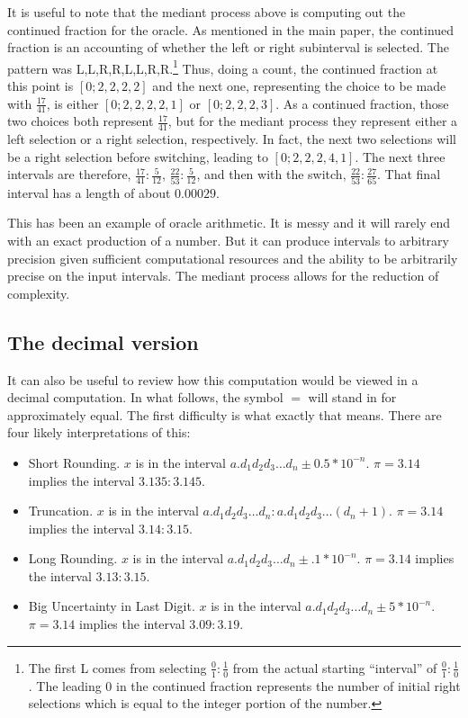 \documentclass[12pt]{article}
\theoremstyle{remark}
\begin{document}
It is useful to note that the mediant process above is computing out the continued fraction for the oracle. As mentioned in the main paper, the continued fraction is an accounting of whether the left or right subinterval is selected. The pattern was L,L,R,R,L,L,R,R.\footnote{The first L comes from selecting $\frac{0}{1}: \frac{1}{0}$ from the actual starting ``interval'' of $\frac{0}{1}: \frac{1}{0}$. The leading 0 in the continued fraction represents the number of initial right selections which is equal to the integer portion of the number.} Thus, doing a count, the continued fraction at this point is $[0;2,2,2,2]$ and the next one, representing the choice to be made with $\frac{17}{41}$, is either $[0;2,2,2,2,1]$ or $[0;2,2,2,3]$. As a continued fraction, those two choices both represent $\frac{17}{41}$, but for the mediant process they represent either a left selection or a right selection, respectively. In fact, the next two selections will be a right selection before switching, leading to $[0;2,2,2,4,1]$. The next three intervals are therefore, $\frac{17}{41}: \frac{5}{12}$, $\frac{22}{53}: \frac{5}{12}$, and then with the switch, $\frac{22}{53}: \frac{27}{65}$. That final interval has a length of about $0.00029$. 

This has been an example of oracle arithmetic. It is messy and it will rarely end with an exact production of a number. But it can produce intervals to arbitrary precision given sufficient computational resources and the ability to be arbitrarily precise on the input intervals. The mediant process allows for the reduction of complexity. 

\subsection{The decimal version}

It can also be useful to review how this computation would be viewed in a decimal computation. In what follows, the symbol $=$ will stand in for approximately equal. The first difficulty is what exactly that means. There are four likely interpretations of this:

\begin{itemize}
\item Short Rounding. $x$ is in the interval $a.d_1d_2d_3\ldots d_n \pm 0.5*10^{-n}$. $\pi = 3.14$ implies the interval $3.135:3.145$.
\item Truncation. $x$ is in the interval $a.d_1d_2d_3\ldots d_n: a.d_1d_2d_3\ldots (d_n+1)$. $\pi=3.14$ implies the interval $3.14:3.15$.
\item Long Rounding. $x$ is in the interval $a.d_1d_2d_3\ldots d_n \pm .1*10^{-n}$. $\pi = 3.14$ implies the interval $3.13:3.15$. 
\item Big Uncertainty in Last Digit. $x$ is in the interval $a.d_1d_2d_3\ldots d_n \pm 5*10^{-n}$. $\pi = 3.14$ implies the interval $3.09:3.19$. 
\end{itemize}
\end{document}
